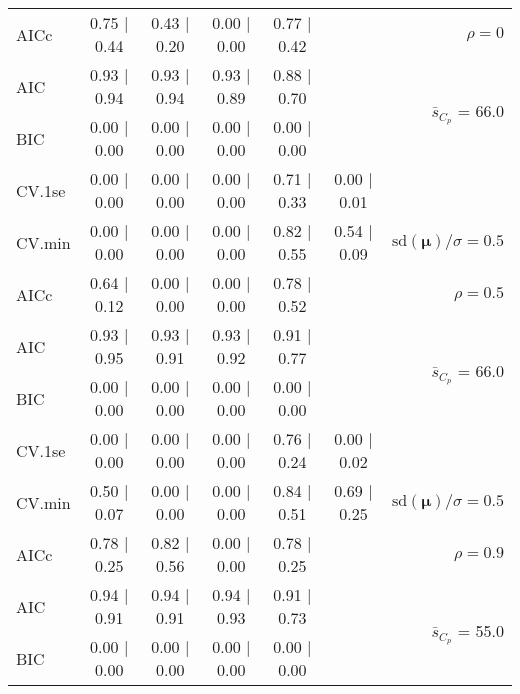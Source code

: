 \documentclass[12pt]{article}
\newcommand{\mr}[1]{\mathrm{#1}}
\newcommand{\bm}[1]{\mathbf{#1}}
\begin{document}
\begin{table}[p]
\begin{center}
\begin{tabular}{l*{5}{c}|r}
AICc & 0.75 $\mid$ 0.44 & 0.43 $\mid$ 0.20 & 0.00 $\mid$ 0.00 & 0.77 $\mid$ 0.42 & & $\rho=0$ \\
AIC & 0.93 $\mid$ 0.94 & 0.93 $\mid$ 0.94 & 0.93 $\mid$ 0.89 & 0.88 $\mid$ 0.70 & & \multirow{2}{*}{$\bar{s}_{C_p}$ = 66.0} \\
BIC & 0.00 $\mid$ 0.00 & 0.00 $\mid$ 0.00 & 0.00 $\mid$ 0.00 & 0.00 $\mid$ 0.00 & & \\
 \hline 
CV.1se & 0.00 $\mid$ 0.00 & 0.00 $\mid$ 0.00 & 0.00 $\mid$ 0.00 & 0.71 $\mid$ 0.33 & 0.00 $\mid$ 0.01 &\\
CV.min & 0.00 $\mid$ 0.00 & 0.00 $\mid$ 0.00 & 0.00 $\mid$ 0.00 & 0.82 $\mid$ 0.55 & 0.54 $\mid$ 0.09 &  $\mr{sd}(\bm{\mu})/\sigma=0.5$ \\
AICc & 0.64 $\mid$ 0.12 & 0.00 $\mid$ 0.00 & 0.00 $\mid$ 0.00 & 0.78 $\mid$ 0.52 & & $\rho=0.5$ \\
AIC & 0.93 $\mid$ 0.95 & 0.93 $\mid$ 0.91 & 0.93 $\mid$ 0.92 & 0.91 $\mid$ 0.77 & & \multirow{2}{*}{$\bar{s}_{C_p}$ = 66.0} \\
BIC & 0.00 $\mid$ 0.00 & 0.00 $\mid$ 0.00 & 0.00 $\mid$ 0.00 & 0.00 $\mid$ 0.00 & & \\
 \hline 
CV.1se & 0.00 $\mid$ 0.00 & 0.00 $\mid$ 0.00 & 0.00 $\mid$ 0.00 & 0.76 $\mid$ 0.24 & 0.00 $\mid$ 0.02 &\\
CV.min & 0.50 $\mid$ 0.07 & 0.00 $\mid$ 0.00 & 0.00 $\mid$ 0.00 & 0.84 $\mid$ 0.51 & 0.69 $\mid$ 0.25 &  $\mr{sd}(\bm{\mu})/\sigma=0.5$ \\
AICc & 0.78 $\mid$ 0.25 & 0.82 $\mid$ 0.56 & 0.00 $\mid$ 0.00 & 0.78 $\mid$ 0.25 & & $\rho=0.9$ \\
AIC & 0.94 $\mid$ 0.91 & 0.94 $\mid$ 0.91 & 0.94 $\mid$ 0.93 & 0.91 $\mid$ 0.73 & & \multirow{2}{*}{$\bar{s}_{C_p}$ = 55.0} \\
BIC & 0.00 $\mid$ 0.00 & 0.00 $\mid$ 0.00 & 0.00 $\mid$ 0.00 & 0.00 $\mid$ 0.00 & & \\
 \hline 
 \end{tabular}
\end{center}
\vspace{-1cm}
\end{table}
\end{document}
